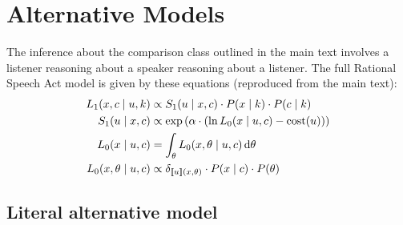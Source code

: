 \documentclass[doc]{apa6}
\begin{document}
\section{Alternative Models}


The inference about the comparison class outlined in the main text involves a listener reasoning about a speaker reasoning about a listener. The full Rational Speech Act model is given by these equations (reproduced from the main text): 
%
\begin{align}
L_1(x, c \mid u, k) &\propto S_1(u \mid x, c) \cdot P(x \mid k) \cdot P(c \mid k)  \label{eq:L1a} \\ 
S_1(u \mid x, c) &\propto \exp{(\alpha \cdot (\ln L_{0}(x \mid u, c) - \text{cost}(u) ))}\label{eq:S1} \\
L_{0}(x \mid u, c) &= \int_{\theta} L_{0}(x, \theta \mid u, c) \mathop{}\!\mathrm{d}\theta \label{eq:L0_marg} \\ 
L_{0}(x, \theta \mid u, c) &\propto {\delta_{[\![u]\!](x, \theta)} \cdot P(x \mid c)} \cdot P(\theta) \label{eq:L0}
\end{align}



\subsection{Literal alternative model}
\end{document}
